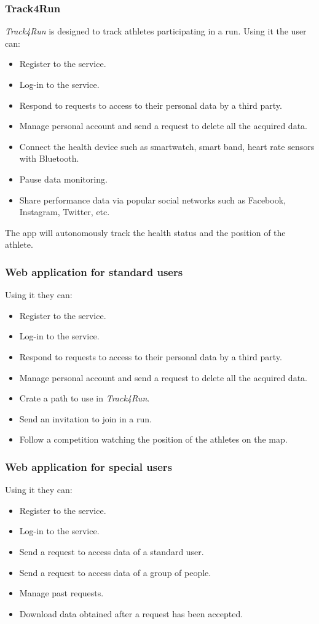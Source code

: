 \subsubsection{Track4Run}
\textit{Track4Run} is designed to track athletes participating in a run.
Using it the user can:
\begin{itemize}
\item Register to the service.
\item Log-in to the service.
\item Respond to requests to access to their personal data by a third party.
\item Manage personal account and send a request to delete all the acquired data.
\item Connect the health device such as smartwatch, smart band, heart rate sensors with Bluetooth.
\item Pause data monitoring.
\item Share performance data via popular social networks such as Facebook, Instagram, Twitter, etc.
\end{itemize}
The app will autonomously track the health status and the position of the athlete.

\subsubsection{Web application for standard users}
Using it they can:
\begin{itemize}
\item Register to the service.
\item Log-in to the service.
\item Respond to requests to access to their personal data by a third party.
\item Manage personal account and send a request to delete all the acquired data.
\item Crate a path to use in \textit{Track4Run}.
\item Send an invitation to join in a run.
\item Follow a competition watching the position of the athletes on the map.
\end{itemize}

\subsubsection{Web application for special users}
Using it they can:
\begin{itemize}
\item Register to the service.
\item Log-in to the service.
\item Send a request to access data of a standard user.
\item Send a request to access data of a group of people.
\item Manage past requests.
\item Download data obtained after a request has been accepted.
\end{itemize}

